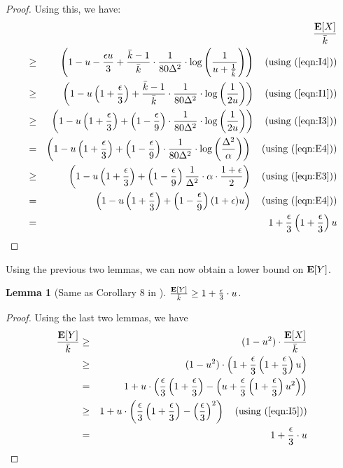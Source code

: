 \documentclass[11pt]{article}
\newtheorem{lemma}[theorem]{Lemma}
\newcommand{\ex}{{\bf E}}
\newcommand{\eps}{{\epsilon}}
\begin{document}
\begin{proof}
Using this, we have:
\begin{eqnarray*}
&&\frac{\ex[X]}{\bar{k}}\\
&\geq& \left(1 - u - \frac{\eps u}{3} + \frac{\bar{k}-1}{\bar{k}} \cdot \frac{1}{80  \Delta^2} \cdot \log \left( \frac{1}{u + \frac{1}{\bar{k}}}\right)\right) \quad \textrm{(using (\ref{eqn:I4}))}\\
&\geq& \left(1 - u \left(1+\frac{\eps}{3}\right)  + \frac{\bar{k}-1}{\bar{k}} \cdot \frac{1}{80 \Delta^2} \cdot \log \left( \frac{1}{2u}\right)\right) \quad \textrm{(using (\ref{eqn:I1}))}\\
&\geq& \left(1 - u \left(1+\frac{\eps}{3}\right)  + \left(1 -\frac{\eps}{9}\right)\cdot \frac{1}{80 \Delta^2} \cdot \log \left( \frac{1}{2u}\right)\right) \quad \textrm{(using (\ref{eqn:I3}))}\\
&=& \left(1 - u \left(1+\frac{\eps}{3}\right)  + \left(1 - \frac{\eps}{9}\right)\cdot \frac{1}{80 \Delta^2} \cdot \log \left( \frac{\Delta^2}{\alpha}\right)\right) \quad \textrm{(using (\ref{eqn:E4}))}\\
&\geq& \left(1 - u \left(1+\frac{\eps}{3}\right)  + \left(1 - \frac{\eps}{9}\right) \frac{1}{\Delta^2} \cdot \alpha \cdot \frac{1+\eps}{2}\right) \quad \textrm{(using (\ref{eqn:E3}))}\\
&=& \left(1 - u \left(1+\frac{\eps}{3}\right)  + \left(1 - \frac{\eps}{9}\right) (1+\eps) u\right) \quad \textrm{(using (\ref{eqn:E4}))}\\
&=& 1 + \frac{\eps}{3} \left( 1 + \frac{\eps}{3}\right)  u
\end{eqnarray*}
\end{proof}

Using the previous two lemmas, we can now obtain a lower bound on $\ex[Y]$.

\begin{lemma}[Same as Corollary 8 in \cite{br12}]\label{lemma:19}
$\frac{\ex[Y]}{\bar{k}} \geq 1 + \frac{\eps}{3} \cdot u$.
\end{lemma}
\begin{proof}
Using the last two lemmas, we have
\begin{eqnarray*}
\frac{\ex[Y]}{\bar{k}} &\geq& (1 - u^2) \cdot \frac{\ex[X]}{\bar{k}} \\
&\geq& (1 - u^2) \cdot \left( 1 + \frac{\eps}{3} \left( 1 + \frac{\eps}{3}\right) u \right) \\
&=& 1 + u \cdot \left( \frac{\eps}{3} \left(1 + \frac{\eps}{3}\right) - \left(u + \frac{\eps}{3} \left( 1 + \frac{\eps}{3}\right) u^2\right)\right)\\
&\geq& 1 + u \cdot \left( \frac{\eps}{3}  \left(1 + \frac{\eps}{3}\right) - \left(\frac{\eps}{3}\right)^2\right) \quad \textrm{(using (\ref{eqn:I5}))}\\
&=& 1 + \frac{\eps}{3} \cdot u
\end{eqnarray*}
\end{proof}
\end{document}
